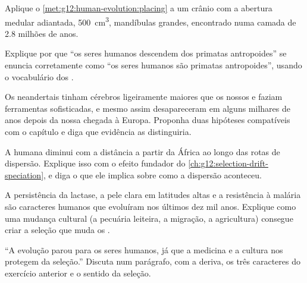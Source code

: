 \begin{exercise}[$\star\star$]\label{exo:g12:human-evolution:10}
Aplique o \cref{met:g12:human-evolution:placing} a um crânio com a
abertura medular adiantada, \qty{500}{cm^3}, mandíbulas grandes,
encontrado numa camada de 2.8 milhões de anos.
\end{exercise}

\begin{exercise}[$\star\star$]\label{exo:g12:human-evolution:11}
Explique por que ``os seres humanos descendem dos primatas antropoides''
se enuncia corretamente como ``os seres humanos são primatas
antropoides'', usando o vocabulário dos .
\end{exercise}

\begin{exercise}[$\star\star\star$]\label{exo:g12:human-evolution:12}
Os neandertais tinham cérebros ligeiramente maiores que os nossos e
faziam ferramentas sofisticadas, e mesmo assim desapareceram em alguns
milhares de anos depois da nossa chegada à Europa. Proponha duas
hipóteses compatíveis com o capítulo e diga que evidência as distinguiria.
\end{exercise}

\begin{exercise}[$\star\star\star$]\label{exo:g12:human-evolution:13}
A  humana diminui com a distância a partir da
África ao longo das rotas de dispersão. Explique isso com o efeito
fundador do \cref{ch:g12:selection-drift-speciation}, e diga o que ele
implica sobre como a dispersão aconteceu.
\end{exercise}

\begin{exercise}[$\star\star\star$]\label{exo:g12:human-evolution:14}
A persistência da lactase, a pele clara em latitudes altas e a
resistência à malária são caracteres humanos que evoluíram nos últimos
dez mil anos. Explique como uma mudança cultural (a pecuária leiteira,
a migração, a agricultura) consegue criar a seleção que muda os .
\end{exercise}

\begin{exercise}[$\star\star\star$]\label{exo:g12:human-evolution:15}
``A evolução parou para os seres humanos, já que a medicina e a cultura
nos protegem da seleção.'' Discuta num parágrafo, com a deriva, os três
caracteres do exercício anterior e o sentido da seleção.
\end{exercise}

